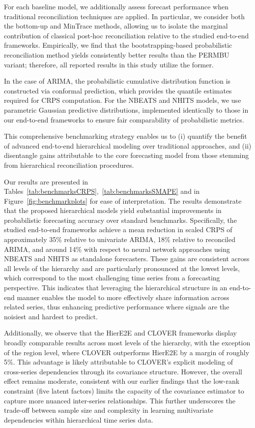 \documentclass[letterpaper]{article}
\begin{document}
For each baseline model, we additionally assess forecast performance when traditional reconciliation techniques are applied. 
In particular, we consider both the bottom-up and MinTrace methods, allowing us to isolate the marginal contribution of classical post-hoc reconciliation relative to the studied end-to-end frameworks. 
Empirically, we find that the bootstrapping-based probabilistic reconciliation method yields consistently better results than the PERMBU variant; therefore, all reported results in this study utilize the former.

In the case of ARIMA, the probabilistic cumulative distribution function is constructed via conformal prediction, which provides the quantile estimates required for CRPS computation. 
For the NBEATS and NHITS models, we use parametric Gaussian predictive distributions, implemented identically to those in our end-to-end frameworks to ensure fair comparability of probabilistic metrics.

This comprehensive benchmarking strategy enables us to (i) quantify the benefit of advanced end-to-end hierarchical modeling over traditional approaches, 
and (ii) disentangle gains attributable to the core forecasting model from those stemming from hierarchical reconciliation procedures.

Our results are presented in Tables~\ref{tab:benchmarksCRPS},~\ref{tab:benchmarksSMAPE} and in Figure~\ref{fig:benchmarkplots} for ease of interpretation. 
The results demonstrate that the proposed hierarchical models yield substantial improvements in probabilistic forecasting accuracy over standard benchmarks. 
Specifically, the studied end-to-end frameworks achieve a mean reduction in scaled CRPS of approximately 35\% relative to univariate ARIMA, 18\% relative to reconciled ARIMA, and around 14\% with respect to neural network approaches using NBEATS and NHITS as standalone forecasters. 
These gains are consistent across all levels of the hierarchy and are particularly pronounced at the lowest levels, which correspond to the most challenging time series from a forecasting perspective. 
This indicates that leveraging the hierarchical structure in an end-to-end manner enables the model to more effectively share information across related series, thus enhancing predictive performance where signals are the noisiest and hardest to predict.

Additionally, we observe that the HierE2E and CLOVER frameworks display broadly comparable results across most levels of the hierarchy, with the exception of the region level, where CLOVER outperforms HierE2E by a margin of roughly 5\%. 
This advantage is likely attributable to CLOVER’s explicit modeling of cross-series dependencies through its covariance structure. 
However, the overall effect remains moderate, consistent with our earlier findings that the low-rank constraint (five latent factors) limits the capacity of the covariance estimator to capture more nuanced inter-series relationships. 
This further underscores the trade-off between sample size and complexity in learning multivariate dependencies within hierarchical time series data.
\end{document}
